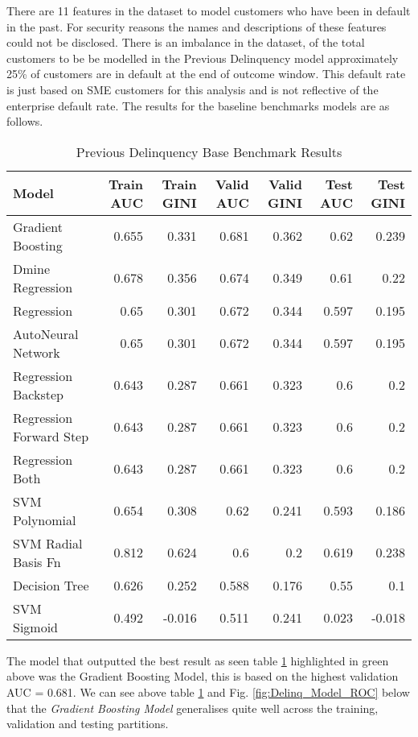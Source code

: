 There are 11 features in the dataset to model customers who have been in default in the past. For security reasons the names and descriptions of these features could not be disclosed. There is an imbalance in the dataset, of the total customers to be be modelled in the Previous Delinquency model approximately 25\% of customers are in default at the end of outcome window. This default rate is just based on SME customers for this analysis and is not reflective of the enterprise default rate. The results for the baseline benchmarks models are as follows.
\begin{table}[H]
	\centering
	\resizebox{\textwidth}{!}
	{
	\begin{tabular}{l | r | r| r |r| r|r}
		\hline
		\textbf{Model} & \textbf{Train AUC} & \textbf{Train GINI} & \textbf{Valid AUC} & \textbf{Valid GINI}& \textbf{Test AUC} & \textbf{Test GINI}\\
		\hline
		\cellcolor{green!25}Gradient Boosting & \cellcolor{green!25}0.655 & \cellcolor{green!25}0.331 & \cellcolor{green!25}0.681 & \cellcolor{green!25}0.362 & \cellcolor{green!25}0.62 & \cellcolor{green!25}0.239 \\
		Dmine Regression & 0.678 & 0.356 & 0.674 & 0.349 & 0.61 & 0.22 \\
		Regression & 0.65 & 0.301 & 0.672 & 0.344 & 0.597 & 0.195 \\
		AutoNeural Network & 0.65 & 0.301 & 0.672 & 0.344 & 0.597 & 0.195 \\
		Regression Backstep & 0.643 & 0.287 & 0.661 & 0.323 & 0.6 & 0.2 \\
		Regression Forward Step & 0.643 & 0.287 & 0.661 & 0.323 & 0.6 & 0.2 \\
		Regression Both & 0.643 & 0.287 & 0.661 & 0.323 & 0.6 & 0.2 \\
		SVM Polynomial & 0.654 & 0.308 & 0.62 & 0.241 & 0.593 & 0.186 \\
		SVM Radial Basis Fn & 0.812 & 0.624 & 0.6 & 0.2 & 0.619 & 0.238 \\
		Decision Tree & 0.626 & 0.252 & 0.588 & 0.176 & 0.55 & 0.1 \\
		SVM Sigmoid & 0.492 & -0.016 & 0.511 & 0.241 & 0.023 & -0.018 \\
		\hline
	\end{tabular}
	}
	\caption{Previous Delinquency Base Benchmark Results}
	\label{table:prevdelinqbase}
\end{table}

The model that outputted the best result as seen table \ref{table:prevdelinqbase} highlighted in green above  was the Gradient Boosting Model, this is based on the highest validation AUC = 0.681. We can see above table \ref{table:prevdelinqbase} and Fig. \ref{fig:Delinq_Model_ROC} below that the \textit{Gradient Boosting Model} generalises quite well across the training, validation and testing partitions.

